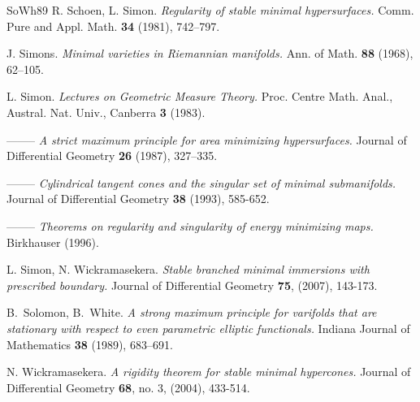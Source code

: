 \documentclass[a4paper,11pt]{amsart}
\begin{document}
\begin{thebibliography}{SoWh89}
 R. Schoen, L. Simon.  
\textit{Regularity of stable minimal hypersurfaces.} Comm. Pure and Appl.
Math. {\bf 34} (1981), 742--797.



 J. Simons.  
\textit{Minimal varieties in Riemannian manifolds.} Ann. of Math. {\bf 88} (1968), 
62--105.

 L. Simon. 
\textit{Lectures on Geometric Measure Theory.} 
Proc. Centre Math. Anal., Austral. Nat. Univ., Canberra {\bf 3} (1983).


 --------
\textit{A strict maximum principle for area minimizing hypersurfaces.} 
Journal of Differential Geometry {\bf 26} (1987), 327--335.

 --------
\textit{Cylindrical tangent cones and the singular set of
minimal submanifolds.} 
Journal of Differential Geometry {\bf 38} (1993), 585-652.

 --------
\textit{Theorems on regularity and singularity of energy minimizing maps.}
Birkhauser (1996).
 

 L. Simon, N. Wickramasekera. 
\textit{Stable branched minimal immersions with prescribed boundary.} 
Journal of Differential Geometry  {\bf 75},  (2007), 143-173. 

 B.~Solomon, B.~White.
\textit{A strong maximum principle for varifolds that are stationary with respect to even parametric elliptic functionals.}
Indiana Journal of Mathematics {\bf 38} (1989), 683--691.

 N. Wickramasekera.  
\textit{A rigidity theorem for stable minimal hypercones.} 
Journal of Differential Geometry {\bf 68}, no. 3, (2004), 433-514.


\end{thebibliography}
\end{document}
